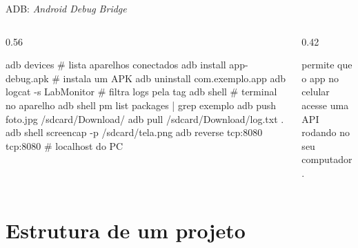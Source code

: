 \documentclass[aspectratio=169,10pt]{beamer}
\begin{document}
\begin{frame}[fragile]{ADB: \emph{Android Debug Bridge}}
  \begin{columns}[T]
    \begin{column}{0.56\textwidth}
\begin{terminal}[title=Comandos úteis]
adb devices                 # lista aparelhos conectados
adb install app-debug.apk   # instala um APK
adb uninstall com.exemplo.app
adb logcat -s LabMonitor    # filtra logs pela tag
adb shell                   # terminal no aparelho
adb shell pm list packages | grep exemplo
adb push foto.jpg /sdcard/Download/
adb pull /sdcard/Download/log.txt .
adb shell screencap -p /sdcard/tela.png
adb reverse tcp:8080 tcp:8080  # localhost do PC
\end{terminal}
    \end{column}
    \begin{column}{0.42\textwidth}
      \centering
      \begin{dica}
         permite que o app no celular acesse uma API rodando no seu computador.
      \end{dica}
    \end{column}
  \end{columns}
\end{frame}

\section{Estrutura de um projeto}
\end{document}
